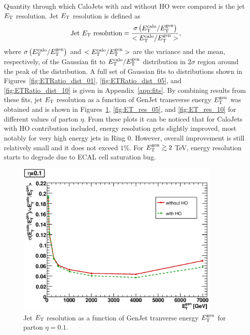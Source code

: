 \documentclass{cmspaper}
\begin{document}
Quantity through which CaloJets with and without HO were compared is the jet $E_\text T$ resolution. Jet $E_\text T$ resolution is defined as
\begin{equation}
 \text{Jet }E_\text T\text{ resolution}=\frac{\sigma\left(E^\text{calo}_\text T/E^\text{gen}_\text T \right)}{<E^\text{calo}_\text T/E^\text{gen}_\text T>},
\end{equation} 
where $\sigma\left(E^\text{calo}_\text T/E^\text{gen}_\text T \right)$ and $<E^\text{calo}_\text T/E^\text{gen}_\text T>$ are the variance and the mean, respectively, of the Gaussian fit to $E^\text{calo}_\text T/E^\text{gen}_\text T$ distribution in $2\sigma$ region around the peak of the distribution. A full set of Gaussian fits to distributions shown in Figures~\ref{fig:ETRatio_dist_01}, \ref{fig:ETRatio_dist_05}, and \ref{fig:ETRatio_dist_10} is given in Appendix~\ref{app:fits}. By combining results from these fits, jet $E_\text T$ resolution as a function of GenJet transverse energy $E^\text{gen}_\text T$ was obtained and is shown in Figures~\ref{fig:ET_res_01}, \ref{fig:ET_res_05}, and \ref{fig:ET_res_10} for different values of parton $\eta$. From these plots it can be noticed that for CaloJets with HO contribution included, energy resolution gets slightly improved, most notably for very high energy jets in Ring $0$. However, overall improvement is still relatively small and it does not exceed $1\%$. For $E^\text{gen}_\text T\gtrsim2$ TeV, energy resolution starts to degrade due to ECAL cell saturation bug.
\begin{figure}
 \centering
 \includegraphics[width=4in]{figs/ET_resolution_corr_eta0.1.eps}
 \caption{Jet $E_\text T$ resolution as a function of GenJet tranverse energy $E^\text{gen}_\text T$ for parton $\eta=0.1$.}
 \label{fig:ET_res_01}
\end{figure}
\end{document}
